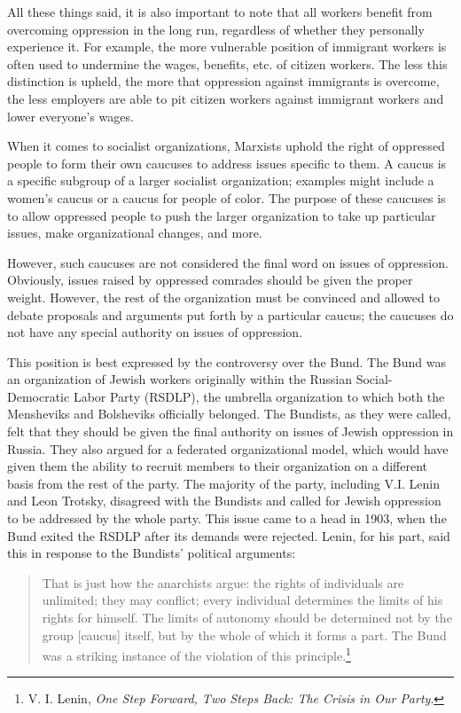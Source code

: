 All these things said, it is also important to note that all workers benefit from overcoming oppression in the long run, regardless of whether they personally experience it. For example, the more vulnerable position of immigrant workers is often used to undermine the wages, benefits, etc. of citizen workers. The less this distinction is upheld, the more that oppression against immigrants is overcome, the less employers are able to pit citizen workers against immigrant workers and lower everyone's wages.

When it comes to socialist organizations, Marxists uphold the right of oppressed people to form their own caucuses to address issues specific to them. A caucus is a specific subgroup of a larger socialist organization; examples might include a women's caucus or a caucus for people of color. The purpose of these caucuses is to allow oppressed people to push the larger organization to take up particular issues, make organizational changes, and more.

However, such caucuses are not considered the final word on issues of oppression. Obviously, issues raised by oppressed comrades should be given the proper weight. However, the rest of the organization must be convinced and allowed to debate proposals and arguments put forth by a particular caucus; the caucuses do not have any special authority on issues of oppression.

This position is best expressed by the controversy over the Bund. The Bund was an organization of Jewish workers originally within the Russian Social-Democratic Labor Party (RSDLP), the umbrella organization to which both the Mensheviks and Bolsheviks officially belonged. The Bundists, as they were called, felt that they should be given the final authority on issues of Jewish oppression in Russia. They also argued for a federated organizational model, which would have given them the ability to recruit members to their organization on a different basis from the rest of the party. The majority of the party, including V.I. Lenin and Leon Trotsky, disagreed with the Bundists and called for Jewish oppression to be addressed by the whole party. This issue came to a head in 1903, when the Bund exited the RSDLP after its demands were rejected. Lenin, for his part, said this in response to the Bundists' political arguments:

\blockquote{That is just how the anarchists argue: the rights of individuals are unlimited; they may conflict; every individual determines the limits of his rights for himself. The limits of autonomy should be determined not by the group [caucus] itself, but by the whole of which it forms a part. The Bund was a striking instance of the violation of this principle.\footnote{V. I. Lenin, \emph{One Step Forward, Two Steps Back: The Crisis in Our Party}.}}

